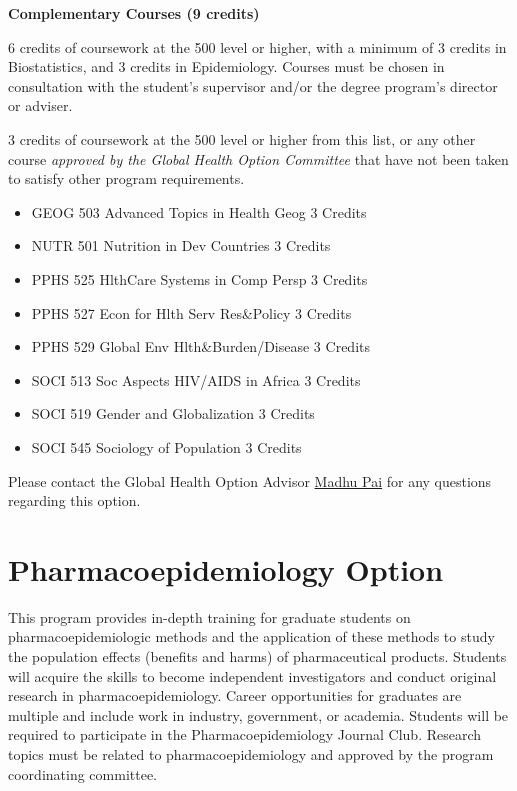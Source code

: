 \documentclass[
  openany]{book}
\providecommand{\tightlist}{%
  \setlength{\itemsep}{0pt}\setlength{\parskip}{0pt}}
\begin{document}
\textbf{Complementary Courses (9 credits)}

6 credits of coursework at the 500 level or higher, with a minimum of 3 credits in Biostatistics, and 3 credits in Epidemiology. Courses must be chosen in consultation with the student's supervisor and/or the degree program's director or adviser.

3 credits of coursework at the 500 level or higher from this list, or any other course \emph{approved by the Global Health Option Committee} that have not been taken to satisfy other program requirements.

\begin{itemize}
\tightlist
\item
  GEOG 503 Advanced Topics in Health Geog 3 Credits
\item
  NUTR 501 Nutrition in Dev Countries 3 Credits
\item
  PPHS 525 HlthCare Systems in Comp Persp 3 Credits
\item
  PPHS 527 Econ for Hlth Serv Res\&Policy 3 Credits
\item
  PPHS 529 Global Env Hlth\&Burden/Disease 3 Credits
\item
  SOCI 513 Soc Aspects HIV/AIDS in Africa 3 Credits
\item
  SOCI 519 Gender and Globalization 3 Credits
\item
  SOCI 545 Sociology of Population 3 Credits
\end{itemize}

Please contact the Global Health Option Advisor \href{mailto:madhukar.pai@mcgill.ca}{Madhu Pai} for any questions regarding this option.

\hypertarget{pharmacoepidemiology-option}{%
\section{Pharmacoepidemiology Option}\label{pharmacoepidemiology-option}}

This program provides in-depth training for graduate students on pharmacoepidemiologic methods and the application of these methods to study the population effects (benefits and harms) of pharmaceutical products. Students will acquire the skills to become independent investigators and conduct original research in pharmacoepidemiology. Career opportunities for graduates are multiple and include work in industry, government, or academia. Students will be required to participate in the Pharmacoepidemiology Journal Club. Research topics must be related to pharmacoepidemiology and approved by the program coordinating committee.
\end{document}
